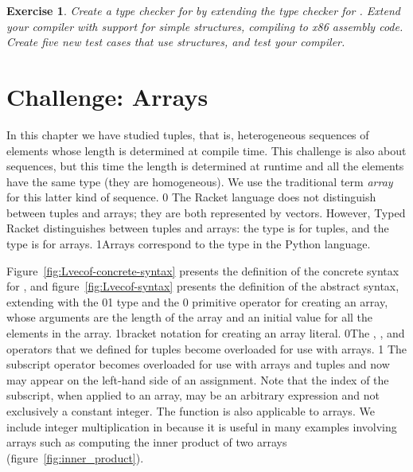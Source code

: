 \documentclass[7x10]{TimesAPriori_MIT}%
\def\racketEd{0}
\def\pythonEd{1}
\providecommand{\BookEdition}{1}
\let\edition\BookEdition
\newcommand{\racket}[1]{{\if\edition\racketEd{#1}\fi}}
\newcommand{\pythonColor}[0]{}
\newcommand{\python}[1]{{\if\edition\pythonEd\pythonColor #1\fi}}
\newtheorem{exercise}[theorem]{Exercise}
\numberwithin{theorem}{chapter}
\numberwithin{definition}{chapter}
\numberwithin{equation}{chapter}
\begin{document}
{\begin{exercise}\normalfont\normalsize
  Create a type checker for \LangStruct{} by extending the type
  checker for \LangVec{}. Extend your compiler with support for simple
  structures, compiling \LangStruct{} to x86 assembly code. Create
  five new test cases that use structures, and test your compiler.
\end{exercise}


\clearpage
\fi}

\section{Challenge: Arrays}
\label{sec:arrays}


In this chapter we have studied tuples, that is, heterogeneous
sequences of elements whose length is determined at compile time. This
challenge is also about sequences, but this time the length is
determined at runtime and all the elements have the same type (they
are homogeneous). We use the traditional term \emph{array} for this
latter kind of sequence.
%
\racket{
The Racket language does not distinguish between tuples and arrays;
they are both represented by vectors. However, Typed Racket
distinguishes between tuples and arrays: the \code{Vector} type is for
tuples, and the \code{Vectorof} type is for arrays.}%
\python{Arrays correspond to the  type in the Python language.}

Figure~\ref{fig:Lvecof-concrete-syntax} presents the definition of the
concrete syntax for \LangArray{}, and figure~\ref{fig:Lvecof-syntax}
presents the definition of the abstract syntax, extending \LangVec{}
with the \racket{}\python{} type and the
\racket{ primitive operator for creating an array,
whose arguments are the length of the array and an initial value for
all the elements in the array.}%
\python{bracket notation for creating an array literal.}
\racket{The ,
, and \code{vector-ref!} operators that we defined
for tuples become overloaded for use with arrays.}
\python{
The subscript operator becomes overloaded for use with arrays and tuples
and now may appear on the left-hand side of an assignment.
Note that the index of the subscript, when applied to an array, may be an
arbitrary expression and not exclusively a constant integer.
The \code{len} function is also applicable to arrays.
}
%
We include integer multiplication in \LangArray{} because it is
useful in many examples involving arrays such as computing the
inner product of two arrays (figure~\ref{fig:inner_product}).
\end{document}

